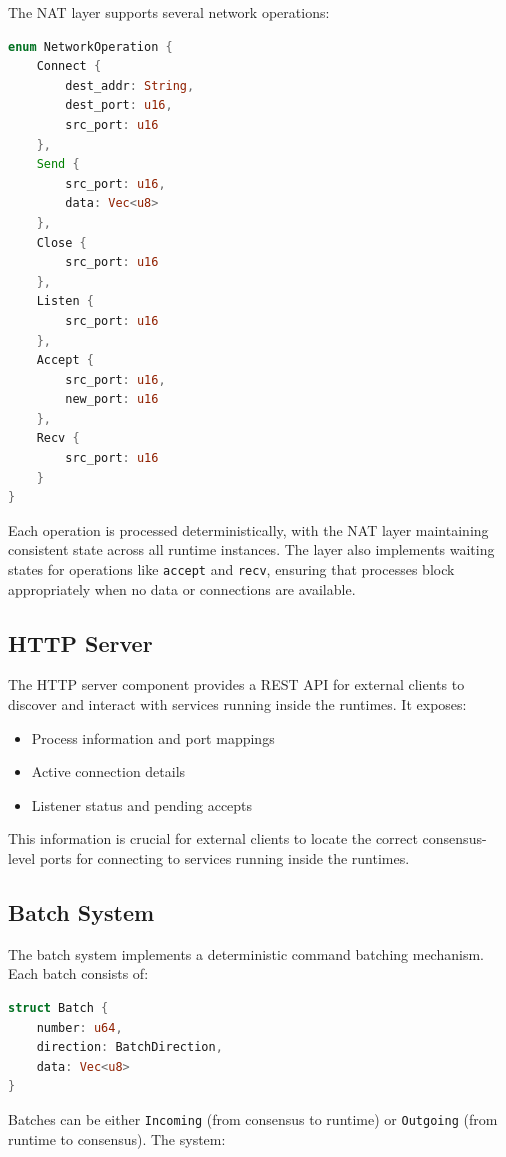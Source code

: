 \documentclass[10pt, 
]{IEEEtran}
\begin{document}
The NAT layer supports several network operations:
\begin{lstlisting}[language=Rust]
enum NetworkOperation {
    Connect { 
        dest_addr: String,
        dest_port: u16,
        src_port: u16
    },
    Send { 
        src_port: u16,
        data: Vec<u8>
    },
    Close { 
        src_port: u16
    },
    Listen { 
        src_port: u16
    },
    Accept { 
        src_port: u16,
        new_port: u16
    },
    Recv { 
        src_port: u16
    }
}
\end{lstlisting}

Each operation is processed deterministically, with the NAT layer maintaining consistent state across all runtime instances. The layer also implements waiting states for operations like \texttt{accept} and \texttt{recv}, ensuring that processes block appropriately when no data or connections are available.

\subsection{HTTP Server}

The HTTP server component provides a REST API for external clients to discover and interact with services running inside the runtimes. It exposes:

\begin{itemize}
    \item Process information and port mappings
    \item Active connection details
    \item Listener status and pending accepts
\end{itemize}

This information is crucial for external clients to locate the correct consensus-level ports for connecting to services running inside the runtimes.

\subsection{Batch System}

The batch system implements a deterministic command batching mechanism. Each batch consists of:

\begin{lstlisting}[language=Rust]
struct Batch {
    number: u64,
    direction: BatchDirection,
    data: Vec<u8>
}
\end{lstlisting}

Batches can be either \texttt{Incoming} (from consensus to runtime) or \texttt{Outgoing} (from runtime to consensus). The system:
\end{document}

